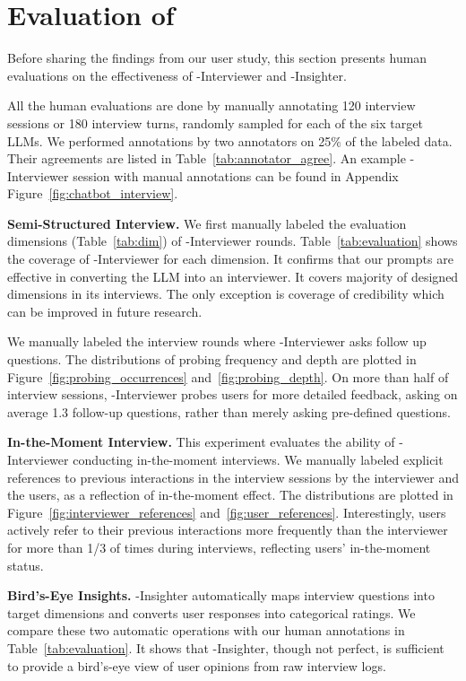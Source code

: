\section{Evaluation of \method{}}
\label{sec.evaluation}

Before sharing the findings from our user study, this section presents human evaluations on the effectiveness of \method{}-Interviewer and \method-Insighter.

All the human evaluations are done by manually annotating 120 interview sessions or 180 interview turns, randomly sampled for each of the six target LLMs. 
We performed annotations by two annotators on 25\% of the labeled data. Their agreements are listed in Table~\ref{tab:annotator_agree}. An example \method-Interviewer session with manual annotations can be found in Appendix Figure~\ref{fig:chatbot_interview}.

\textbf{Semi-Structured Interview.} We first manually labeled the evaluation dimensions (Table~\ref{tab:dim}) of \method-Interviewer rounds. Table~\ref{tab:evaluation} shows the coverage of \method-Interviewer for each dimension. It confirms that our prompts are effective in converting the LLM into an interviewer.
It covers majority of designed dimensions in its interviews. The only exception is coverage of credibility which can be improved in future research.

We manually labeled the interview rounds where \method-Interviewer asks follow up questions. 
The distributions of probing frequency and depth are plotted in Figure~\ref{fig:probing_occurrences} and~\ref{fig:probing_depth}. 
On more than half of interview sessions, \method-Interviewer probes users for more detailed feedback, asking on average 1.3 follow-up questions, rather than merely asking pre-defined questions.

\textbf{In-the-Moment Interview.} 
This experiment evaluates the ability of \method-Interviewer conducting in-the-moment interviews. 
We manually labeled explicit references to previous interactions in the interview sessions by the interviewer and the users, as a reflection of in-the-moment effect. The distributions are plotted in Figure~\ref{fig:interviewer_references} and~\ref{fig:user_references}. 
Interestingly, users actively refer to their previous interactions more frequently than the interviewer for more than 1/3 of times during interviews, reflecting users' in-the-moment status.

\textbf{Bird's-Eye Insights.}  \method-Insighter automatically maps interview questions into target dimensions and converts user responses into categorical ratings. We compare these two automatic operations with our human annotations in Table~\ref{tab:evaluation}. It shows that \method-Insighter, though not perfect, is sufficient to provide a bird's-eye view of user opinions from raw interview logs.